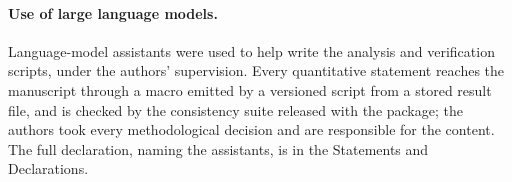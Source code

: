 \paragraph{Use of large language models.} Language-model assistants were used to help
write the analysis and verification scripts, under the authors' supervision. Every quantitative
statement reaches the manuscript through a macro emitted by a versioned script from a
stored result file, and is checked by the consistency suite released with the package; the
authors took every methodological decision and are responsible for the content. The full
declaration, naming the assistants, is in the Statements and Declarations.
